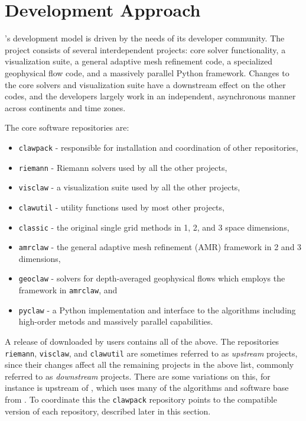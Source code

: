 %
%
%

\section{Development Approach} \label{sec:development}

\clawpack's development model is driven by the needs of its
developer community.  The \clawpack project consists of several
interdependent projects: core solver functionality, a
visualization suite, a general adaptive mesh refinement code, a
specialized geophysical flow code, and a massively parallel Python
framework.  Changes to the core solvers and visualization suite have a
downstream effect on the other codes, and the developers largely work
in an independent, asynchronous manner across continents and time
zones.

\vskip 5pt
The core \clawpack software repositories are:
\begin{itemize}
    \item \texttt{clawpack} - responsible for installation and coordination of
    other repositories,
    \item \texttt{riemann} - Riemann solvers used by all the other
    projects,
    \item \texttt{visclaw} - a visualization suite used by all the other
    projects,
    \item \texttt{clawutil} - utility functions used by most other
    projects,
    \item \texttt{classic} - the original single grid methods in 1, 2, and 3
    space dimensions,
    \item \texttt{amrclaw} - the general adaptive mesh refinement (AMR)
    framework in 2 and 3 dimensions,
    \item \texttt{geoclaw} - solvers for depth-averaged
    geophysical flows which employs the framework in \texttt{amrclaw}, and
    \item \texttt{pyclaw} - a Python implementation and interface to the
    \clawpack algorithms including high-order metods and massively 
    parallel capabilities.
\end{itemize}

\noindent
A release of \clawpack downloaded by users contains all of the above.
The repositories \texttt{riemann}, \texttt{visclaw}, and
\texttt{clawutil} are sometimes referred to as \textit{upstream} projects, since
their changes
affect all the remaining projects in the above list, commonly referred to as 
\textit{downstream} projects.  There are some variations on this, for instance 
\amrclaw is upstream of \geoclaw, which uses many of the algorithms and
software base from
\amrclaw.  To coordinate this the \texttt{clawpack} repository
points to the compatible version of each repository, 
described later in this section.


